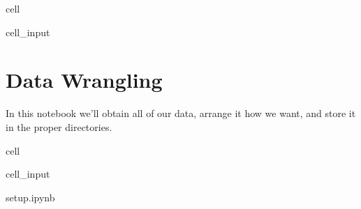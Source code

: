 \documentclass[letterpaper,10pt,english]{jupyterBook}
\begin{document}
\begin{sphinxuseclass}{cell}
\begin{sphinxVerbatimInput}
\begin{sphinxuseclass}{cell_input}
\begin{sphinxVerbatim}[commandchars=\\\{\}]
            
            
            \PYG{p}{[} \PYG{p}{]}



         
\end{sphinxVerbatim}

\end{sphinxuseclass}\end{sphinxVerbatimInput}

\end{sphinxuseclass}
\sphinxstepscope


\section{Data Wrangling}
\label{\detokenize{notebooks/SL_Data_Wrangling:data-wrangling}}\label{\detokenize{notebooks/SL_Data_Wrangling::doc}}
\sphinxAtStartPar
In this notebook we’ll obtain all of our data, arrange it how we want, and store it in the proper directories.

\begin{sphinxuseclass}{cell}\begin{sphinxVerbatimInput}

\begin{sphinxuseclass}{cell_input}
\begin{sphinxVerbatim}[commandchars=\\\{\}]
 setup.ipynb
  
  
\end{sphinxVerbatim}

\end{sphinxuseclass}\end{sphinxVerbatimInput}

\end{sphinxuseclass}
\end{document}
